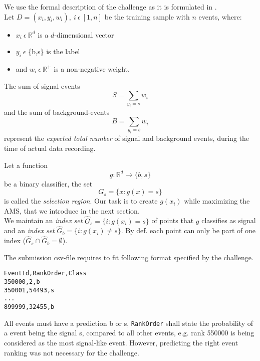We use the formal description of the challenge as it is formulated in \cite{higgsPaper}.\\
Let $D = {(x_i,y_i,w_i)}, \ i \ \epsilon \ [1,n]$ be the training sample with $n$ events, where:

\begin{itemize}
	\item $x_i \ \epsilon \ \mathbb{R}^{d}$ is a $d$-dimensional vector
	\item $y_i \ \epsilon$ \{b,s\} is the label
	\item and $w_i \ \epsilon \ \mathbb{R}^{+}$ is a non-negative weight.
\end{itemize}

The sum of signal-events
$$S = \sum_{y_i = s} w_i$$
and the sum of background-events
$$B = \sum_{y_i = b} w_i$$
represent the \emph{expected total number} of signal and background events, during the time of actual data recording.

Let a function $$g:  \mathbb{R}^{d} \rightarrow \{b,s\}$$ be a binary classifier, the set $$ G_s = \{x : g(x) = s \} $$ is called the \emph{selection region}.
Our task is to create $g(x_i)$ while maximizing the AMS, that we introduce in the next section.\\
We maintain an \emph{index set} 
$ \hat{G}_s = \{i : g(x_i) = s \} $ of points that $g$ classifies as signal and an \emph{index set} $ \hat{G}_b = \{i : g(x_i) \neq s \} $. By def. each point can only be part of one index ($\hat{G}_s \cap \hat{G}_b = \emptyset$).

The submission csv-file requires to fit following format specified by the challenge.

\begin{verbatim}
EventId,RankOrder,Class
350000,2,b
350001,54493,s
...
899999,32455,b
\end{verbatim}

All events must have a prediction b or s, \texttt{RankOrder} shall state the probability of a event being the signal s, compared to all other events, e.g. rank 550000 is being considered as the most signal-like event. However, predicting the right event ranking was not necessary for the challenge.